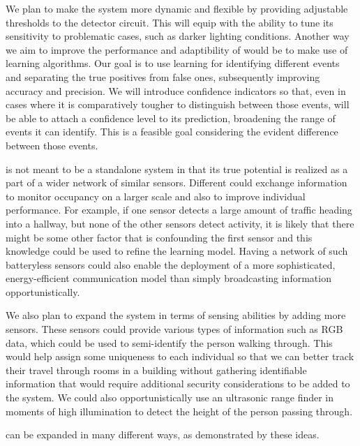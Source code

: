  We plan to make the system more dynamic and flexible by providing adjustable thresholds to the detector circuit.
This will equip \sysname with the ability to tune its sensitivity to problematic cases, such as darker lighting conditions.
Another way we aim to improve the performance and adaptibility of \sysname would be to make use of learning algorithms.
Our goal is to use learning for identifying different events and separating the true positives from false ones, subsequently improving accuracy and precision.
We will introduce confidence indicators so that, even in cases where it is comparatively tougher to distinguish between those events, \sysname will be able to attach a confidence level to its prediction, broadening the range of events it can identify.
This is a feasible goal considering the evident difference between those events.

\sysname is not meant to be a standalone system in that its true potential is realized as a part of a wider network of similar sensors.
Different \sysnames could exchange information to monitor occupancy on a larger scale and also to improve individual performance.
For example, if one sensor detects a large amount of traffic heading into a hallway, but none of the other sensors detect activity, it is likely that there might be some other factor that is confounding the first sensor and this knowledge could be used to refine the learning model.
Having a network of such batteryless sensors could also enable the deployment of a more sophisticated, energy-efficient communication model than simply broadcasting information opportunistically.

 We also plan to expand the system in terms of sensing abilities by adding more sensors.
These sensors could provide various types of information such as RGB data, which could be used to semi-identify the person walking through.
This would help assign some uniqueness to each individual so that we can better track their travel through rooms in a building without gathering identifiable information that would require additional security considerations to be added to the system.
We could also opportunistically use an ultrasonic range finder in moments of high illumination to detect the height of the person passing through.

\sysname can be expanded in many different ways, as demonstrated by these ideas.



